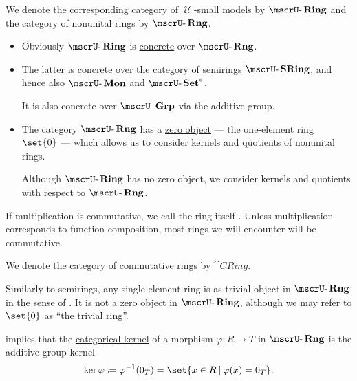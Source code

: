 \begin{definition}
\begin{thmenum}
    \mimprovised We denote the corresponding \hyperref[def:category_of_small_first_order_models]{category of \( \mscrU \)-small models} by \( \ucat{Ring} \) and the category of nonunital rings by \( \ucat{Rng} \).

    \begin{itemize}
      \item Obviously \( \ucat{Ring} \) is \hyperref[def:concrete_category]{concrete} over \( \ucat{Rng} \).
      \item The latter is \hyperref[def:concrete_category]{concrete} over the category of semirings \hyperref[def:semiring/category]{\( \ucat{SRing} \)}, and hence also \hyperref[def:monoid/category]{\( \ucat{Mon} \)} and \hyperref[def:pointed_set/category]{\( \ucat{Set}^* \)}.

      It is also concrete over \hyperref[def:group/category]{\( \ucat{Grp} \)} via the additive group.

      \item The category \( \ucat{Rng} \) has a \hyperref[def:universal_objects/zero]{zero object} --- the one-element ring \( \set{ 0 } \) --- which allows us to consider kernels and quotients of nonunital rings.

      Although \( \ucat{Ring} \) has no zero object, we consider kernels and quotients with respect to \( \ucat{Rng} \).
    \end{itemize}

     If multiplication is commutative, we call the ring itself . Unless multiplication corresponds to function composition, most rings we will encounter will be commutative.

    We denote the category of commutative rings by \( \cat{CRing} \).

     Similarly to semirings, any single-element ring is as trivial object in \( \ucat{Rng} \) in the sense of . It is not a zero object in \( \ucat{Ring} \), although we may refer to \( \set{ 0 } \) as \enquote{the trivial ring}.

    \mimprovised {} implies that the \hyperref[def:zero_morphisms/kernel]{categorical kernel} of a morphism \( \varphi: R \to T \) in \( \ucat{Rng} \) is the additive group kernel
    \begin{equation*}
      \ker \varphi \coloneqq \varphi^{-1}(0_T) = \set{ x \in R \given \varphi(x) = 0_T }.
    \end{equation*}


\end{thmenum}
\end{definition}
